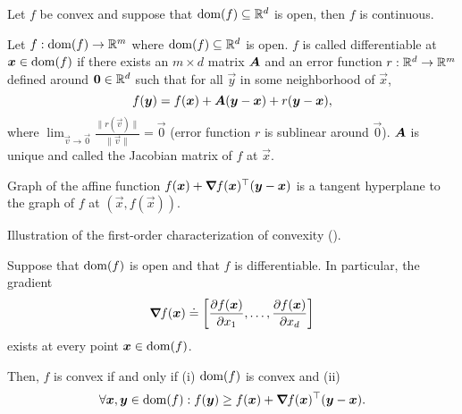 \begin{lemma}
    \label{lem:convex-continuous}

    Let $f$ be convex and suppose that $\mathrm{dom}(f)\subseteq \mathbb{R}^d$ is open, then $f$ is continuous.
\end{lemma}

\begin{definition}
    Let $f: \mathrm{dom}(f)\to \mathbb{R}^m$ where $\mathrm{dom}(f)\subseteq \mathbb{R}^d$ is open. $f$ is called differentiable at $\bm{x}\in\mathrm{dom}(f)$ if there exists an $m \times d$ matrix $\bm{A}$ and an error function $r: \mathbb{R}^d \to \mathbb{R}^m$ defined around $\bm{0}\in \mathbb{R}^d$ such that for all $\vec{y}$ in some neighborhood of $\vec{x}$, \[
        f(\bm{y}) = f(\bm{x}) + \bm{A} (\bm{y} - \bm{x}) + r(\bm{y} - \bm{x}),
    \]
    where $\lim_{\vec{v}\to\vec{0}} \frac{\| r(\vec{v}) \|}{\| \vec{v} \|} = \vec{0}$ (error function $r$ is sublinear around $\vec{0}$).
    $\bm{A}$ is unique and called the Jacobian matrix of $f$ at $\vec{x}$.
\end{definition}

\begin{marginfigure}[-6cm]
    \centering
    \caption{Graph of the affine function $f(\bm{x}) + \bm{\nabla}_{\! } f(\bm{x})^\top(\bm{y}-\bm{x})$ is a tangent hyperplane to the graph of $f$ at $(\vec{x},f(\vec{x}))$.}
    \label{fig:differentiable-function}
\end{marginfigure}

\begin{marginfigure}
    \centering
    \caption{Illustration of the first-order characterization of convexity ().}
    \label{fig:first-order-convexity}
\end{marginfigure}

\begin{lemma}
    \label{lem:first-order-convexity}

    Suppose that $\mathrm{dom}(f)$ is open and that $f$ is differentiable. In particular, the gradient \[
        \grad{f(\vec{x})}{} \doteq \lft[ \pdv{f(\vec{x})}{x_1}, \ldots, \pdv{f(\vec{x})}{x_d} \rgt]
    \]
    exists at every point $\bm{x}\in\mathrm{dom}(f)$.

    Then, $f$ is convex if and only if (i) $\mathrm{dom}(f)$ is convex and (ii) \[
        \forall \bm{x},\bm{y} \in \mathrm{dom}(f) : f(\bm{y}) \geq f(\bm{x}) + \bm{\nabla}_{\! } f(\bm{x})^\top (\bm{y}-\bm{x}).
    \]
\end{lemma}

